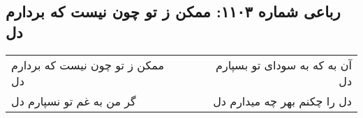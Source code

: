 \begin{center}
\section*{رباعی شماره ۱۱۰۳: ممکن ز تو چون نیست که بردارم دل}
\label{sec:1103}
\begin{longtable}{l p{0.5cm} r}
ممکن ز تو چون نیست که بردارم دل
&&
آن به که به سودای تو بسپارم دل
\\
گر من به غم تو نسپارم دل
&&
دل را چکنم بهر چه میدارم دل
\\
\end{longtable}
\end{center}
